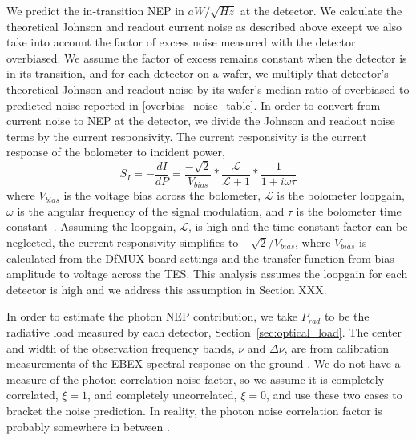 We predict the in-transition \ac{NEP} in $aW/\sqrt{Hz}$ at the detector. 
We calculate the theoretical Johnson and readout current noise as described above except we also take into account the factor of excess noise measured with the detector overbiased. 
We assume the factor of excess remains constant when the detector is in its transition, and for each detector on a wafer, we multiply that detector's theoretical Johnson and readout noise by its wafer's median ratio of overbiased to predicted noise reported in \TAB\ref{overbias_noise_table}. 
In order to convert from current noise to \ac{NEP} at the detector, we divide the Johnson and readout noise terms by the current responsivity. 
The current responsivity is the current response of the bolometer to incident power,
\begin{equation}
S_I = -\frac{dI}{dP} = \frac{-\sqrt{2}}{V_{bias}} * \frac{\mathcal{L}}{\mathcal{L} + 1} * \frac{1}{1 + i\omega\tau}
\label{eq:current_responsivity}
\end{equation}
where $V_{bias}$ is the voltage bias across the bolometer, $\mathcal{L}$ is the bolometer loopgain, $\omega$ is the angular frequency of the signal modulation, and $\tau$ is the bolometer time constant~\citep{aubin_thesis}. 
Assuming the loopgain, $\mathcal{L}$, is high and the time constant factor can be neglected, the current responsivity simplifies to $-\sqrt{2}/V_{bias}$, where $V_{bias}$ is calculated from the \ac{DfMUX} board settings and the transfer function from bias amplitude to voltage across the \ac{TES}. 
This analysis assumes the loopgain for each detector is high and we address this assumption in Section XXX. 

In order to estimate the photon \ac{NEP} contribution, we take $P_{rad}$ to be the radiative load measured by each detector, Section~\ref{sec:optical_load}. 
The center and width of the observation frequency bands, $\nu$ and $\Delta \nu$, are from calibration measurements of the \ac{EBEX} spectral response on the ground \citep{Zilic_thesis}. 
We do not have a measure of the photon correlation noise factor, so we assume it is completely correlated, $\xi=1$, and completely uncorrelated, $\xi=0$, and use these two cases to bracket the noise prediction. 
In reality, the photon noise correlation factor is probably somewhere in between \cite{}. 

